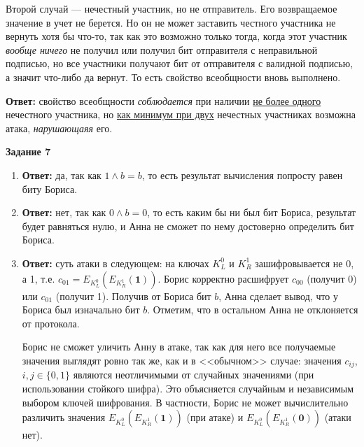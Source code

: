 \documentclass[12pt, a4paper]{extarticle}
\newenvironment*{dummyenv}{}{}
\newcommand{\mysection}[1]{
    \addcontentsline{toc}{section}{#1}
    \begin{dummyenv}
        \bfseries\large #1
    \end{dummyenv}
}
\newcommand{\Answer}[1]{\textbf{Ответ:} #1}
\begin{document}
\begin{enumerate}
        Второй случай --- нечестный участник, но не отправитель. Его возвращаемое значение в учет не
        берется. Но он не может заставить честного участника не вернуть хотя бы что-то, так как это
        возможно только тогда, когда этот участник \textit{вообще ничего} не получил или получил бит
        отправителя с неправильной подписью, но все участники получают бит от отправителя с валидной
        подписью, а значит что-либо да вернут. То есть свойство всеобщности вновь выполнено.
        
        \Answer{свойство всеобщности \textit{соблюдается} при наличии \underline{не более одного} нечестного 
            участника, но \underline{как минимум при двух} нечестных участниках возможна атака, 
            \textit{нарушающаяя} его.}
\end{enumerate}

\mysection{Задание 7}

\begin{enumerate}
    \item \Answer{да, так как $1 \land b = b$, то есть результат вычисления попросту равен биту Бориса.}
    
    \item \Answer{нет, так как $0 \land b = 0$, то есть каким бы ни был бит Бориса, результат будет равняться
        нулю, и Анна не сможет по нему достоверно определить бит Бориса.
    }
    
    \item \Answer{суть атаки в следующем: на ключах $K_L^0$ и $K_R^1$ зашифровывается не 0, а 1, т.е.
        $c_{01} = E_{K_L^0}\left(E_{K_R^1}(\mathbf{1})\right)$. Борис корректно расшифрует $c_{00}$ 
        (получит 0) или $c_{01}$ (получит 1). Получив от Бориса бит $b$, Анна сделает вывод, что у Бориса 
        был изначально бит $b$. Отметим, что в остальном Анна не отклоняется от протокола.
        
        Борис не сможет уличить Анну в атаке, так как для него все получаемые значения выглядят ровно
        так же, как и в <<обычном>> случае: значения $c_{ij}$, $i, j \in \{0, 1\}$ являются неотличимыми
        от случайных значениями (при использовании стойкого шифра). Это объясняется случайным и независимым
        выбором ключей шифрования. В частности, Борис не может вычислительно различить значения 
        $E_{K_L^0}\left(E_{K_R^1}(\mathbf{1})\right)$ (при атаке) и 
        $E_{K_L^0}\left(E_{K_R^1}(\mathbf{0})\right)$ (атаки нет).
    }
\end{enumerate}
\end{document}
